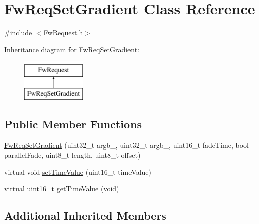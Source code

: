 \hypertarget{class_fw_req_set_gradient}{\section{Fw\-Req\-Set\-Gradient Class Reference}
\label{class_fw_req_set_gradient}
}


{\ttfamily \#include $<$Fw\-Request.\-h$>$}

Inheritance diagram for Fw\-Req\-Set\-Gradient\-:\begin{figure}[H]
\begin{center}
\leavevmode
\includegraphics[height=2.000000cm]{class_fw_req_set_gradient}
\end{center}
\end{figure}
\subsection*{Public Member Functions}
\begin{DoxyCompactItemize}
\item 
\hyperlink{class_fw_req_set_gradient_ad6e51845c71f01b21336ce84548ee650}{Fw\-Req\-Set\-Gradient} (uint32\-\_\-t argb\-\_, uint32\-\_\-t argb\-\_, uint16\-\_\-t fade\-Time, bool parallel\-Fade, uint8\-\_\-t length, uint8\-\_\-t offset)
\item 
virtual void \hyperlink{class_fw_req_set_gradient_ad656a26164aafa1af0631ad15146bed5}{set\-Time\-Value} (uint16\-\_\-t time\-Value)
\item 
virtual uint16\-\_\-t \hyperlink{class_fw_req_set_gradient_aabe0710b7d396b9f8e523a5f3111a71b}{get\-Time\-Value} (void)
\end{DoxyCompactItemize}
\subsection*{Additional Inherited Members}


